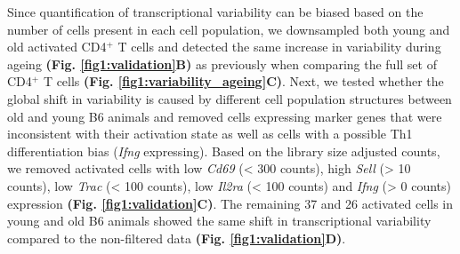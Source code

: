 Since quantification of transcriptional variability can be biased based on the number of cells present in each cell population, we downsampled both young and old activated CD4$^+$ T cells and detected the same increase in variability during ageing \textbf{(Fig. \ref{fig1:validation}B)} as previously when comparing the full set of CD4$^+$ T cells \textbf{(Fig. \ref{fig1:variability_ageing}C)}. Next, we tested whether the global shift in variability is caused by different cell population structures between old and young B6 animals and removed cells expressing marker genes that were inconsistent with their activation state as well as cells with a possible Th1 differentiation bias (\textit{Ifng} expressing). Based on the library size adjusted counts, we removed activated cells with low \textit{Cd69} (< 300 counts), high \textit{Sell} (> 10 counts), low \textit{Trac} (< 100 counts), low \textit{Il2ra} (< 100 counts) and \textit{Ifng} (> 0 counts) expression \textbf{(Fig. \ref{fig1:validation}C)}. The remaining 37 and 26 activated cells in young and old B6 animals showed the same shift in transcriptional variability compared to the non-filtered data \textbf{(Fig. \ref{fig1:validation}D)}. \\

